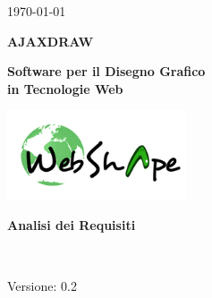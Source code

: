 \usepackage{multirow}


\renewcommand{\insertversion}{0.2} %
\renewcommand{\TITOLODOC}{Analisi dei Requisiti} %

\begin{titlepage}
\begin{center}
	\begin{Large}	\today \end{Large}
\end{center}

\vspace{20pt}

\begin{center}
	\begin{Huge}
				\textbf{AJAXDRAW}
	\end{Huge}
\end{center}			

\begin{center}
	\begin{large}
				\textbf{Software per il Disegno Grafico\\ in Tecnologie Web}
	\end{large}
\end{center}			

\vspace{20pt}

\begin{center}
\includegraphics[width=150pt]{../logo/logo}
\end{center}

\vspace{160pt}
\begin{center} %
	\begin{Huge}
				\textbf{\TITOLODOC}
	\end{Huge}
			\\
\end{center}
\vspace{220pt}
\begin{center}
Versione: \insertversion
\end{center}
\end{titlepage}

